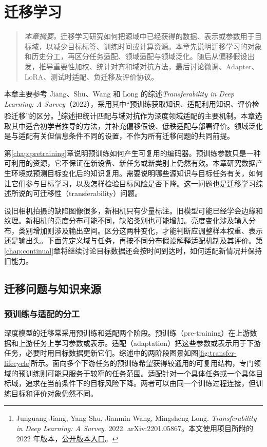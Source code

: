 \chapter{迁移学习}
\label{chap:transfer}
\begin{quote}\small
\textit{本章摘要。}迁移学习研究如何把源域中已经获得的数据、表示或参数用于目标域，以减少目标标签、训练时间或计算资源。本章先说明迁移学习的对象和历史分工，再区分任务适配、领域适配与领域泛化。随后从偏移假设出发，推导重要性加权、统计对齐和域对抗方法，最后讨论微调、Adapter、LoRA、测试时适配、负迁移及评价协议。
\end{quote}

本章主要参考 Jiang、Shu、Wang 和 Long 的综述\textit{Transferability in Deep Learning: A Survey}（2022），采用其中“预训练获取知识、适配利用知识、评价检验迁移”的区分。\footnote{Junguang Jiang, Yang Shu, Jianmin Wang, Mingsheng Long. \textit{Transferability in Deep Learning: A Survey}. 2022. arXiv:2201.05867。本文使用项目所附的 2022 年版本，\href{https://arxiv.org/abs/2201.05867}{公开版本入口}。}综述把统计匹配与域对抗作为深度领域适配的主要机制。本章选取其中适合初学者推导的方法，并补充偏移假设、低秩适配与部署评价。领域泛化是与适配有关但信息条件不同的设置，不作为所有迁移问题的共同前提。

第\ref{chap:pretraining}章说明预训练如何产生可复用的编码器。预训练参数只是一种可利用的资源，它不保证在新设备、新任务或新类别上仍然有效。本章研究数据产生环境或预测目标变化后的知识复用。需要说明哪些源知识与目标任务有关，如何让它们参与目标学习，以及怎样检验目标风险是否下降。这一问题也是迁移学习综述所说的可迁移性（transferability）问题\cite{pan2010transfer}。

设旧相机拍摄的缺陷图像很多，新相机只有少量标注。旧模型可能已经学会边缘和纹理。新相机的亮度分布可能不同，缺陷类别也可能增加。亮度变化涉及输入分布，类别增加则涉及输出空间。区分这两种变化，才能判断应调整样本权重、表示还是输出头。下面先定义域与任务，再按不同分布假设解释适配机制及其评价。第\ref{chap:continual}章将继续讨论目标数据还会按时间到达时，如何适配新情况并保持旧能力。

\section{迁移问题与知识来源}

\subsection{预训练与适配的分工}
深度模型的迁移常采用预训练和适配两个阶段。预训练（pre-training）在上游数据和上游任务上学习参数或表示。适配（adaptation）把这些参数或表示用于下游任务，必要时用目标数据更新它们。综述中的两阶段图景如图\ref{fig:transfer-lifecycle}所示。面向多个下游任务的预训练希望获得较通用的可复用结构，专门领域的预训练则可能只服务于较窄的任务范围。适配针对一个具体任务或一个具体目标域，追求在当前条件下的目标风险下降。两者可以由同一个训练过程连接，但训练目标和评价对象仍然不同。

